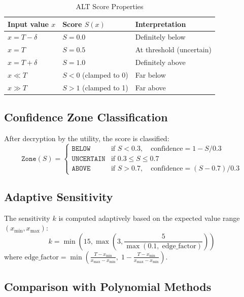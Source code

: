 \begin{table}[H]
\centering
\caption{ALT Score Properties}
\label{tab:alt_properties}
\begin{tabular}{@{}lll@{}}
\toprule
\textbf{Input value $x$} & \textbf{Score $S(x)$} & \textbf{Interpretation} \\
\midrule
$x = T - \delta$ & $S = 0.0$ & Definitely below \\
$x = T$ & $S = 0.5$ & At threshold (uncertain) \\
$x = T + \delta$ & $S = 1.0$ & Definitely above \\
$x \ll T$ & $S < 0$ (clamped to 0) & Far below \\
$x \gg T$ & $S > 1$ (clamped to 1) & Far above \\
\bottomrule
\end{tabular}
\end{table}

\subsection{Confidence Zone Classification}

After decryption by the utility, the score is classified:
\begin{equation}
    \texttt{Zone}(S) = \begin{cases}
        \texttt{BELOW} & \text{if } S < 0.3, \quad \text{confidence} = 1 - S/0.3 \\
        \texttt{UNCERTAIN} & \text{if } 0.3 \leq S \leq 0.7 \\
        \texttt{ABOVE} & \text{if } S > 0.7, \quad \text{confidence} = (S - 0.7)/0.3
    \end{cases}
\end{equation}

\subsection{Adaptive Sensitivity}

The sensitivity $k$ is computed adaptively based on the expected value range $(x_{\min}, x_{\max})$:
\begin{equation}
    k = \min\left(15, \max\left(3, \frac{5}{\max(0.1, \; \text{edge\_factor})}\right)\right)
\end{equation}
where $\text{edge\_factor} = \min\left(\frac{T - x_{\min}}{x_{\max} - x_{\min}}, \; 1 - \frac{T - x_{\min}}{x_{\max} - x_{\min}}\right)$.

\subsection{Comparison with Polynomial Methods}

